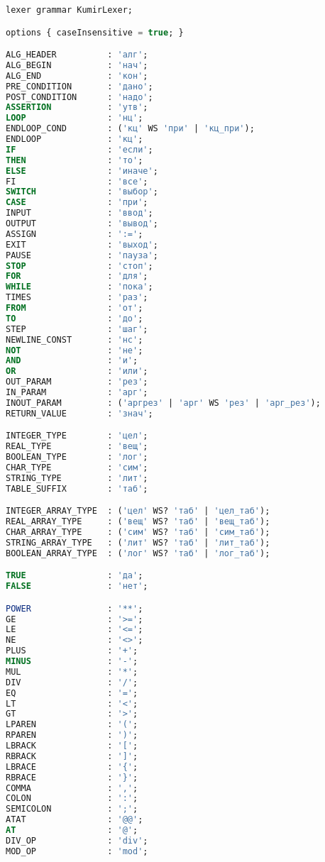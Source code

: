 \begin{lstlisting}[language=sql, caption={Лексер грамматики в формате ANTRL}, label=lst:kafka-click]
lexer grammar KumirLexer;

options { caseInsensitive = true; }

ALG_HEADER          : 'алг';
ALG_BEGIN           : 'нач';
ALG_END             : 'кон';
PRE_CONDITION       : 'дано';
POST_CONDITION      : 'надо';
ASSERTION           : 'утв';
LOOP                : 'нц';
ENDLOOP_COND        : ('кц' WS 'при' | 'кц_при');
ENDLOOP             : 'кц';
IF                  : 'если';
THEN                : 'то';
ELSE                : 'иначе';
FI                  : 'все';
SWITCH              : 'выбор';
CASE                : 'при';
INPUT               : 'ввод';
OUTPUT              : 'вывод';
ASSIGN              : ':=';
EXIT                : 'выход';
PAUSE               : 'пауза';
STOP                : 'стоп';
FOR                 : 'для';
WHILE               : 'пока';
TIMES               : 'раз';
FROM                : 'от';
TO                  : 'до';
STEP                : 'шаг';
NEWLINE_CONST       : 'нс';
NOT                 : 'не';
AND                 : 'и';
OR                  : 'или';
OUT_PARAM           : 'рез';
IN_PARAM            : 'арг';
INOUT_PARAM         : ('аргрез' | 'арг' WS 'рез' | 'арг_рез');
RETURN_VALUE        : 'знач';

INTEGER_TYPE        : 'цел';
REAL_TYPE           : 'вещ';
BOOLEAN_TYPE        : 'лог';
CHAR_TYPE           : 'сим';
STRING_TYPE         : 'лит';
TABLE_SUFFIX        : 'таб';

INTEGER_ARRAY_TYPE  : ('цел' WS? 'таб' | 'цел_таб');
REAL_ARRAY_TYPE     : ('вещ' WS? 'таб' | 'вещ_таб');
CHAR_ARRAY_TYPE     : ('сим' WS? 'таб' | 'сим_таб');
STRING_ARRAY_TYPE   : ('лит' WS? 'таб' | 'лит_таб');
BOOLEAN_ARRAY_TYPE  : ('лог' WS? 'таб' | 'лог_таб');

TRUE                : 'да';
FALSE               : 'нет';

POWER               : '**';
GE                  : '>=';
LE                  : '<=';
NE                  : '<>';
PLUS                : '+';
MINUS               : '-';
MUL                 : '*';
DIV                 : '/';
EQ                  : '=';
LT                  : '<';
GT                  : '>';
LPAREN              : '(';
RPAREN              : ')';
LBRACK              : '[';
RBRACK              : ']';
LBRACE              : '{';
RBRACE              : '}';
COMMA               : ',';
COLON               : ':';
SEMICOLON           : ';';
ATAT                : '@@';
AT                  : '@';
DIV_OP              : 'div';
MOD_OP              : 'mod';


\end{lstlisting}
